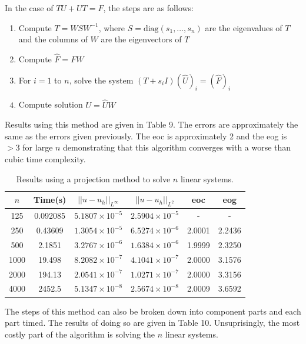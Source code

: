 \documentclass{article}
\numberwithin{equation}{section}
\begin{document}
In the case of $TU + UT = F$, the steps are as follows:
\begin{enumerate}
\item Compute $T = WSW^{-1}$, where $S = \text{diag}(s_1, \dots, s_n)$ are the eigenvalues of $T$ and the columns of $W$ are the eigenvectors of $T$
\item Compute $\hat{F} = FW$
\item For $i=1$ to $n$, solve the system $(T+s_i I)(\hat{U})_i = (\hat{F})_i$
\item Compute solution $U = \hat{U}W$
\end{enumerate}

Results using this method are given in Table 9. The errors are approximately the same as the errors given previously. The eoc is approximately 2 and the eog is $> 3$ for large $n$ demonstrating that this algorithm converges with a worse than cubic time complexity. 
\begin{table}[H]
\centering
\begin{tabular}{|c|c|c|c|c|c|}
\hline
$n$ & Time(s) & $|| u - u_h ||_{L^{\infty}}$ &$|| u - u_h ||_{L^{2}}$ & eoc & eog \\
\hline
125 & 0.092085 & $5.1807 \times 10^{-5}$ & $2.5904 \times 10^{-5}$ & - & - \\
250 & 0.43609 & $1.3054 \times 10^{-5}$ & $6.5274 \times 10^{-6}$ & 2.0001 & 2.2436 \\
500 & 2.1851 & $3.2767 \times 10^{-6}$ & $1.6384 \times 10^{-6}$ & 1.9999 & 2.3250 \\
1000 & 19.498 & $8.2082 \times 10^{-7}$ & $4.1041 \times 10^{-7}$ & 2.0000 & 3.1576 \\
2000 & 194.13 & $2.0541 \times 10^{-7}$ & $1.0271 \times 10^{-7}$ & 2.0000 & 3.3156 \\
4000 & 2452.5 & $5.1347 \times 10^{-8}$ & $2.5674 \times 10^{-8}$ & 2.0009 & 3.6592  \\
\hline
\end{tabular}
\captionsetup{justification=centering}
\caption{Results using a projection method to solve $n$ linear systems.}
\end{table}

The steps of this method can also be broken down into component parts and each part timed. The results of doing so are given in Table 10. Unsuprisingly, the most costly part of the algorithm is solving the $n$ linear systems. 
\end{document}
